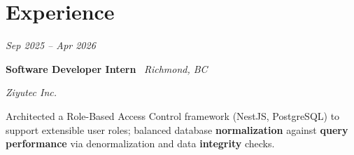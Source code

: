 \section{Experience}

    \begin{twocolentry}{

    \textit{Sep 2025 -- Apr 2026}}
        \textbf{Software Developer Intern} \textbar\ \textit{Richmond, BC}
        
        \textit{Ziyutec Inc.}
    \end{twocolentry}

    \vspace{0.10 cm}
    \begin{onecolentry}
        \begin{highlights}
    
    \item Architected a Role-Based Access Control framework (NestJS, PostgreSQL) to support extensible user roles; balanced database \textbf{normalization} against \textbf{query performance} via denormalization and data \textbf{integrity} checks.
        
        \end{highlights}
    \end{onecolentry}
